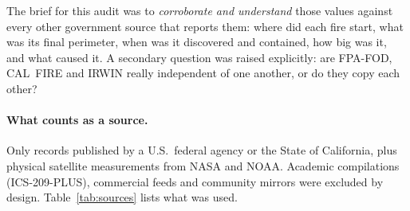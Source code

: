 \documentclass[11pt,a4paper]{article}
\begin{document}
The brief for this audit was to \emph{corroborate and understand} those values against every other
government source that reports them: where did each fire start, what was its final perimeter, when was it
discovered and contained, how big was it, and what caused it. A secondary question was raised explicitly: are
FPA-FOD, CAL~FIRE and IRWIN really independent of one another, or do they copy each other?

\paragraph{What counts as a source.} Only records published by a U.S.\ federal agency or the State of
California, plus physical satellite measurements from NASA and NOAA. Academic compilations (ICS-209-PLUS),
commercial feeds and community mirrors were excluded by design. Table~\ref{tab:sources} lists what was used.
\end{document}
